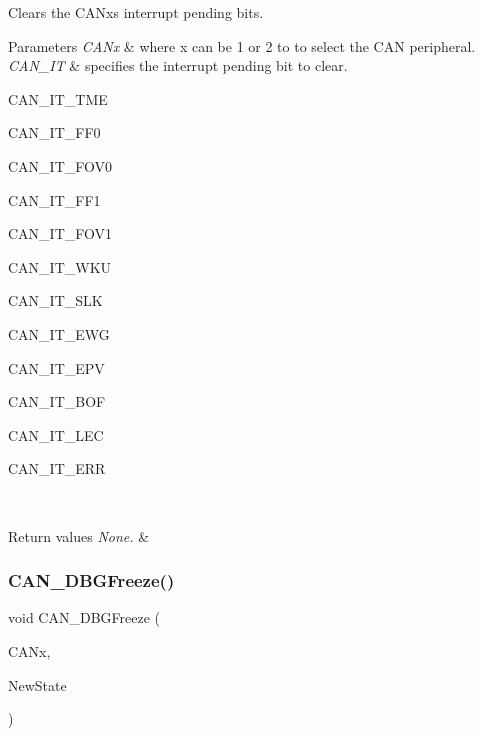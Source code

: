 Clears the C\+A\+Nx\textquotesingle{}s interrupt pending bits. 


\begin{DoxyParams}{Parameters}
{\em C\+A\+Nx} & where x can be 1 or 2 to to select the C\+AN peripheral. \\
\hline
{\em C\+A\+N\+\_\+\+IT} & specifies the interrupt pending bit to clear.
\begin{DoxyItemize}
\item C\+A\+N\+\_\+\+I\+T\+\_\+\+T\+ME
\item C\+A\+N\+\_\+\+I\+T\+\_\+\+F\+F0
\item C\+A\+N\+\_\+\+I\+T\+\_\+\+F\+O\+V0
\item C\+A\+N\+\_\+\+I\+T\+\_\+\+F\+F1
\item C\+A\+N\+\_\+\+I\+T\+\_\+\+F\+O\+V1
\item C\+A\+N\+\_\+\+I\+T\+\_\+\+W\+KU
\item C\+A\+N\+\_\+\+I\+T\+\_\+\+S\+LK
\item C\+A\+N\+\_\+\+I\+T\+\_\+\+E\+WG
\item C\+A\+N\+\_\+\+I\+T\+\_\+\+E\+PV
\item C\+A\+N\+\_\+\+I\+T\+\_\+\+B\+OF
\item C\+A\+N\+\_\+\+I\+T\+\_\+\+L\+EC
\item C\+A\+N\+\_\+\+I\+T\+\_\+\+E\+RR 
\end{DoxyItemize}\\
\hline
\end{DoxyParams}

\begin{DoxyRetVals}{Return values}
{\em None.} & \\
\hline
\end{DoxyRetVals}
\mbox{\label{group___c_a_n___exported___functions_gac0e2d33e08caf49d1f1251f0dcc20213}} 
\subsubsection{\texorpdfstring{CAN\_DBGFreeze()}{CAN\_DBGFreeze()}}
{\footnotesize\ttfamily void C\+A\+N\+\_\+\+D\+B\+G\+Freeze (\begin{DoxyParamCaption}\item[{\mbox{\hyperlink{struct_c_a_n___type_def}{C\+A\+N\+\_\+\+Type\+Def}} $\ast$}]{C\+A\+Nx,  }\item[{\mbox{\hyperlink{group___exported__types_gac9a7e9a35d2513ec15c3b537aaa4fba1}{Functional\+State}}}]{New\+State }\end{DoxyParamCaption})}



